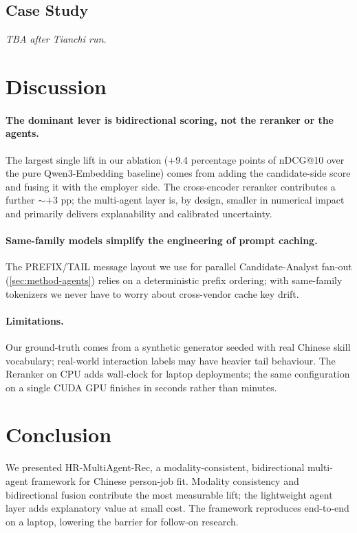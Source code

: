 \documentclass[11pt]{article}
\begin{document}
\subsection{Case Study}
\label{sec:experiments-tianchi}

\emph{TBA after Tianchi run.}

\section{Discussion}
\label{sec:discussion}

\paragraph{The dominant lever is bidirectional scoring, not the
reranker or the agents.} The largest single lift in our ablation
(+9.4 percentage points of nDCG@10 over the pure Qwen3-Embedding
baseline) comes from adding the candidate-side score and fusing it
with the employer side. The cross-encoder reranker contributes a
further ${\sim}+3$ pp; the multi-agent layer is, by design, smaller
in numerical impact and primarily delivers explanability and
calibrated uncertainty.

\paragraph{Same-family models simplify the engineering of prompt
caching.} The PREFIX/TAIL message layout we use for parallel
Candidate-Analyst fan-out (\cref{sec:method-agents}) relies on a
deterministic prefix ordering; with same-family tokenizers we never
have to worry about cross-vendor cache key drift.

\paragraph{Limitations.} Our ground-truth comes from a synthetic
generator seeded with real Chinese skill vocabulary; real-world
interaction labels may have heavier tail behaviour. The Reranker
on CPU adds wall-clock for laptop deployments; the same configuration
on a single CUDA GPU finishes in seconds rather than minutes.

\section{Conclusion}
\label{sec:conclusion}

We presented HR-MultiAgent-Rec, a modality-consistent, bidirectional
multi-agent framework for Chinese person-job fit. Modality consistency
and bidirectional fusion contribute the most measurable lift; the
lightweight agent layer adds explanatory value at small cost. The
framework reproduces end-to-end on a laptop, lowering the barrier for
follow-on research.



\end{document}

